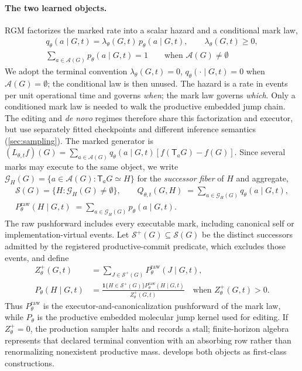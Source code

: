 \documentclass{article}
\newcommand{\rgm}{\textsc{RGM}\xspace}
\newcommand{\A}{\mathcal{A}}
\newcommand{\Sset}{\mathcal{S}}
\newcommand{\T}{\mathsf{T}}
\newcommand{\one}{\mathbf{1}}
\newcommand{\Pmol}{P_{\theta}}
\newcommand{\Praw}{P^{\mathrm{raw}}_{\theta}}
\newcommand{\Gset}{\mathcal{G}}
\theoremstyle{definition}
\theoremstyle{remark}
\begin{document}
\paragraph{The two learned objects.}
\rgm factorizes the marked rate into a scalar hazard and a conditional mark law,
\begin{equation}
\begin{aligned}
q_\theta(a\mid G,t)=\lambda_\theta(G,t)\,p_\theta(a\mid G,t),
\qquad \lambda_\theta(G,t)\ge0,\\
\textstyle\sum_{a\in\A(G)}p_\theta(a\mid G,t)=1
\qquad\text{when }\A(G)\neq\emptyset
\end{aligned}
\label{eq:hazard-marklaw}
\end{equation}
We adopt the terminal convention $\lambda_\theta(G,t)=0$, $q_\theta(\cdot\mid G,t)=0$ when $\A(G)=\emptyset$; the conditional law is then unused. The hazard is a rate in events per unit operational time and governs \emph{when}; the mark law governs \emph{which}. Only a conditioned mark law is needed to walk the productive embedded jump chain. The editing and \emph{de novo} regimes therefore share this factorization and executor, but use separately fitted checkpoints and different inference semantics (\cref{sec:sampling}). The marked generator is $(L_{\theta,t}f)(G)=\sum_{a\in\A(G)}q_\theta(a\mid G,t)[f(\T_aG)-f(G)]$. Since several marks may execute to the same object, we write $\Gset_H(G)=\{a\in\A(G):\T_aG\simeq H\}$ for the \emph{successor fiber} of $H$ and aggregate,
\begin{align}
\Sset(G)=\{H:\Gset_H(G)\neq\emptyset\},\qquad
Q_{\theta,t}(G,H)\;=\!\!\sum_{a\in\Gset_H(G)}\!\! q_\theta(a\mid G,t),\\
\Praw(H\mid G,t)\;=\!\!\sum_{a\in\Gset_H(G)}\!\! p_\theta(a\mid G,t).
\label{eq:quotient-rate}
\end{align}
The raw pushforward includes every executable mark, including canonical self or implementation-virtual events. Let $\Sset^+(G)\subseteq\Sset(G)$ be the distinct successors admitted by the registered productive-commit predicate, which excludes those events, and define
\begin{equation}
\begin{aligned}
Z_\theta^+(G,t)&=\sum_{J\in\Sset^+(G)}\Praw(J\mid G,t),\\
\Pmol(H\mid G,t)&=
\frac{\one\{H\in\Sset^+(G)\}\Praw(H\mid G,t)}{Z_\theta^+(G,t)}
\quad\text{when }Z_\theta^+(G,t)>0.
\end{aligned}
\label{eq:productive-kernel}
\end{equation}
Thus $\Praw$ is the executor-and-canonicalization pushforward of the mark law, while $\Pmol$ is the productive embedded molecular jump kernel used for editing. If $Z_\theta^+=0$, the production sampler halts and records a stall; finite-horizon algebra represents that declared terminal convention with an absorbing row rather than renormalizing nonexistent productive mass.  develops both objects as first-class constructions.
\end{document}

